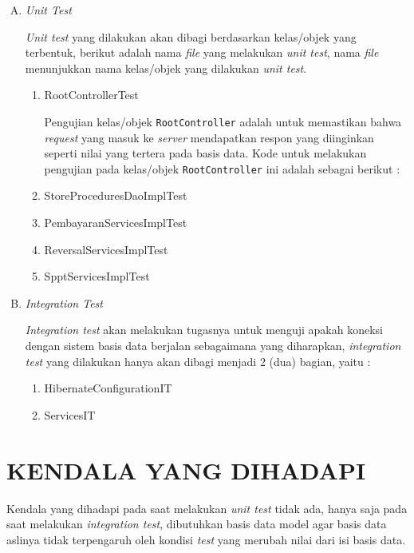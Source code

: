 \documentclass[pdftex,12pt, oneside]{article}
\begin{document}
\begin{enumerate}[A.]
  \item \textit{Unit Test}
  
  \textit{Unit test} yang dilakukan akan dibagi berdasarkan kelas/objek yang terbentuk, berikut adalah nama \textit{file} yang melakukan \textit{unit test}, nama \textit{file} menunjukkan nama kelas/objek yang dilakukan \textit{unit test}.
  
  \begin{enumerate}[1.]
    \item RootControllerTest
    
    Pengujian kelas/objek \texttt{RootController} adalah untuk memastikan bahwa \textit{request} yang masuk ke \textit{server} mendapatkan respon yang diinginkan seperti nilai yang tertera pada basis data. Kode untuk melakukan pengujian pada kelas/objek \texttt{RootController} ini adalah sebagai berikut :
    
    
    
    \item StoreProceduresDaoImplTest
    \item PembayaranServicesImplTest
    \item ReversalServicesImplTest
    \item SpptServicesImplTest
  \end{enumerate}
  
  \item \textit{Integration Test}
  
  \textit{Integration test} akan melakukan tugasnya untuk menguji apakah koneksi dengan sistem basis data berjalan sebagaimana yang diharapkan, \textit{integration test} yang dilakukan hanya akan dibagi menjadi 2 (dua) bagian, yaitu :
  
  \begin{enumerate}[1.]
    \item HibernateConfigurationIT
    \item ServicesIT
  \end{enumerate}
\end{enumerate}


\section{KENDALA YANG DIHADAPI}

Kendala yang dihadapi pada saat melakukan \textit{unit test} tidak ada, hanya saja pada saat melakukan \textit{integration test}, dibutuhkan basis data model agar basis data aslinya tidak terpengaruh oleh kondisi \textit{test} yang merubah nilai dari isi basis data.
\end{document}
